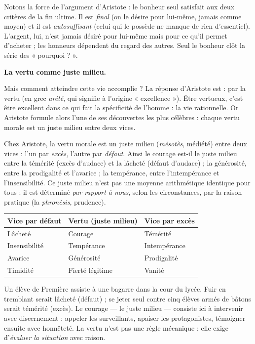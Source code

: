 \documentclass[11pt]{article}
\newcommand{\cle}[1]{{\popxbold\color{popdark}#1}}
\begin{document}
Notons la force de l'argument d'Aristote : le bonheur seul satisfait aux deux critères de la fin ultime. Il est \emph{final} (on le désire pour lui-même, jamais comme moyen) et il est \emph{autosuffisant} (celui qui le possède ne manque de rien d'essentiel). L'argent, lui, n'est jamais désiré pour lui-même mais pour ce qu'il permet d'acheter ; les honneurs dépendent du regard des autres. Seul le bonheur clôt la série des « pourquoi ? ».

\textbf{La vertu comme juste milieu.}\par
Mais comment atteindre cette vie accomplie ? La réponse d'Aristote est : par la \cle{vertu} (en grec \emph{arété}, qui signifie à l'origine « excellence »). Être vertueux, c'est être excellent dans ce qui fait la spécificité de l'homme : la vie rationnelle. Or Aristote formule alors l'une de ses découvertes les plus célèbres : chaque vertu morale est un \cle{juste milieu} entre deux vices.

\begin{propriete}
Chez Aristote, la vertu morale est un juste milieu (\emph{mésotès}, médiété) entre deux vices : l'un par \emph{excès}, l'autre par \emph{défaut}. Ainsi le courage est-il le juste milieu entre la témérité (excès d'audace) et la lâcheté (défaut d'audace) ; la générosité, entre la prodigalité et l'avarice ; la tempérance, entre l'intempérance et l'insensibilité. Ce juste milieu n'est pas une moyenne arithmétique identique pour tous : il est déterminé \emph{par rapport à nous}, selon les circonstances, par la raison pratique (la \emph{phronèsis}, prudence).
\end{propriete}

\begin{center}
\begin{tabularx}{\linewidth}{|l|X|X|}
\hline
\rowcolor{popblueL} \textbf{Vice par défaut} & \textbf{Vertu (juste milieu)} & \textbf{Vice par excès} \\
\hline
Lâcheté & Courage & Témérité \\
\hline
Insensibilité & Tempérance & Intempérance \\
\hline
Avarice & Générosité & Prodigalité \\
\hline
Timidité & Fierté légitime & Vanité \\
\hline
\end{tabularx}
\end{center}

\begin{exemplebox}
Un élève de Première assiste à une bagarre dans la cour du lycée. Fuir en tremblant serait lâcheté (défaut) ; se jeter seul contre cinq élèves armés de bâtons serait témérité (excès). Le courage — le juste milieu — consiste ici à intervenir avec discernement : appeler les surveillants, apaiser les protagonistes, témoigner ensuite avec honnêteté. La vertu n'est pas une règle mécanique : elle exige d'\emph{évaluer la situation} avec raison.
\end{exemplebox}
\end{document}
